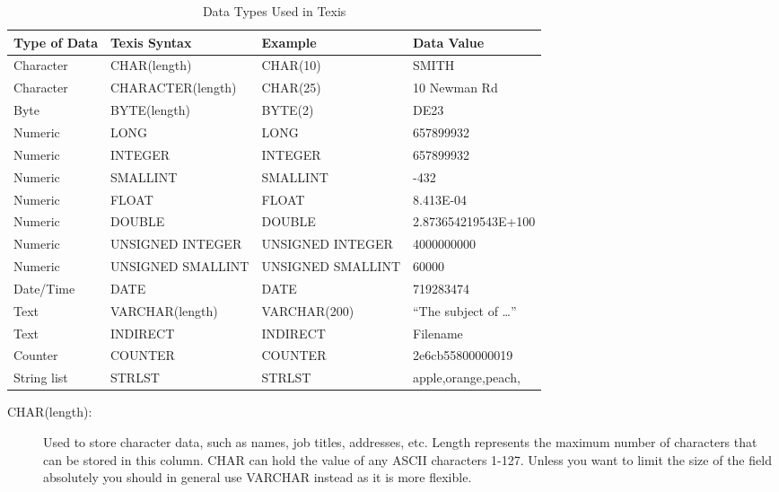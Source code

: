 \begin{description}
\begin{table}
\caption{Data Types Used in Texis}{\label{tab:DTypes}}
\begin{center}
\begin{tabular}{|l|l|l|l|} \hline
Type of Data & Texis Syntax      & Example      & Data Value                \\ \hline\hline
Character    & CHAR(length)      & CHAR(10)     & SMITH                     \\
Character    & CHARACTER(length) & CHAR(25)     & 10 Newman Rd              \\
Byte         & BYTE(length)      & BYTE(2)      & DE23                      \\
Numeric      & LONG              & LONG         & 657899932                 \\
Numeric      & INTEGER           & INTEGER      & 657899932                 \\
Numeric      & SMALLINT          & SMALLINT     & -432                      \\
Numeric      & FLOAT             & FLOAT        & 8.413E-04                 \\
Numeric      & DOUBLE            & DOUBLE       & 2.873654219543E+100       \\
Numeric      & UNSIGNED INTEGER  & UNSIGNED INTEGER & 4000000000            \\
Numeric      & UNSIGNED SMALLINT & UNSIGNED SMALLINT & 60000                \\
Date/Time    & DATE              & DATE         & 719283474                 \\
Text         & VARCHAR(length)   & VARCHAR(200) & ``The subject of \ldots'' \\
Text         & INDIRECT          & INDIRECT     & Filename                  \\
Counter      & COUNTER           & COUNTER      & 2e6cb55800000019          \\
String list  & STRLST            & STRLST       & apple,orange,peach,       \\ \hline
\end{tabular}
\end{center}
\end{table}

\begin{description}
\item[CHAR(length):] Used to store character data, such as names, job
titles, addresses, etc.  Length represents the maximum number of
characters that can be stored in this column.  CHAR can hold the value
of any ASCII characters 1-127.  Unless you want to limit the size of
the field absolutely you should in general use VARCHAR instead as it
is more flexible.


\end{description}
\end{description}
